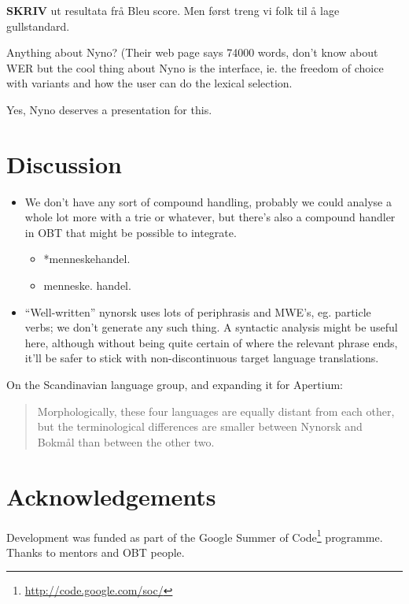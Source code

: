 \documentclass[11pt]{article}
\begin{document}
\textbf{SKRIV} ut resultata frå Bleu score. Men først treng vi folk til å lage gullstandard.

Anything about Nyno? (Their web page says 74000 words, don't know
  about WER but the cool thing about Nyno is the interface, ie. the
  freedom of choice with variants and how the user can do the lexical
  selection.
  
  Yes, Nyno deserves a presentation for this.

\section{Discussion}
\label{sec-5}

\begin{itemize}
\item We don't have any sort of compound handling, probably we could
  analyse a whole lot more with a trie or whatever, but there's also a
  compound handler in OBT that might be possible to integrate.

\begin{itemize}
\item *menneskehandel.
\item menneske. handel.
\end{itemize}

\item ``Well-written'' nynorsk uses lots of periphrasis and MWE's, eg. particle
  verbs; we don't generate any such thing. A syntactic analysis might
  be useful here, although without being quite certain of where the
  relevant phrase ends, it'll be safer to stick with non-discontinuous
  target language translations.
\end{itemize}
On the Scandinavian language group, and expanding it for Apertium:
\begin{quote}
Morphologically, these four languages are equally distant from each
other, but the terminological differences are smaller between Nynorsk
and Bokmål than between the other two. \\
\citep{everson2000sln}
\end{quote}


\section{Acknowledgements}
\label{sec-6}

Development was funded as part of the Google Summer of Code\footnote{\href{http://code.google.com/soc/}{http://code.google.com/soc/} }
programme. Thanks to mentors and OBT people.



\end{document}
